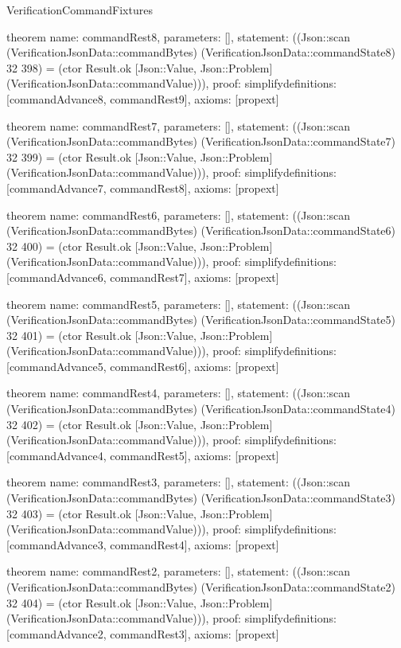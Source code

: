 \begin{lexlean}{VerificationCommandFixtures}
\begin{semanticmodule}
theorem{
  name: commandRest8,
  parameters: [],
  statement: ((Json::scan (VerificationJsonData::commandBytes) (VerificationJsonData::commandState8) 32 398) = (ctor Result.ok [Json::Value, Json::Problem] (VerificationJsonData::commandValue))),
  proof: simplify{definitions: [commandAdvance8, commandRest9]},
  axioms: [propext]
}

theorem{
  name: commandRest7,
  parameters: [],
  statement: ((Json::scan (VerificationJsonData::commandBytes) (VerificationJsonData::commandState7) 32 399) = (ctor Result.ok [Json::Value, Json::Problem] (VerificationJsonData::commandValue))),
  proof: simplify{definitions: [commandAdvance7, commandRest8]},
  axioms: [propext]
}

theorem{
  name: commandRest6,
  parameters: [],
  statement: ((Json::scan (VerificationJsonData::commandBytes) (VerificationJsonData::commandState6) 32 400) = (ctor Result.ok [Json::Value, Json::Problem] (VerificationJsonData::commandValue))),
  proof: simplify{definitions: [commandAdvance6, commandRest7]},
  axioms: [propext]
}

theorem{
  name: commandRest5,
  parameters: [],
  statement: ((Json::scan (VerificationJsonData::commandBytes) (VerificationJsonData::commandState5) 32 401) = (ctor Result.ok [Json::Value, Json::Problem] (VerificationJsonData::commandValue))),
  proof: simplify{definitions: [commandAdvance5, commandRest6]},
  axioms: [propext]
}

theorem{
  name: commandRest4,
  parameters: [],
  statement: ((Json::scan (VerificationJsonData::commandBytes) (VerificationJsonData::commandState4) 32 402) = (ctor Result.ok [Json::Value, Json::Problem] (VerificationJsonData::commandValue))),
  proof: simplify{definitions: [commandAdvance4, commandRest5]},
  axioms: [propext]
}

theorem{
  name: commandRest3,
  parameters: [],
  statement: ((Json::scan (VerificationJsonData::commandBytes) (VerificationJsonData::commandState3) 32 403) = (ctor Result.ok [Json::Value, Json::Problem] (VerificationJsonData::commandValue))),
  proof: simplify{definitions: [commandAdvance3, commandRest4]},
  axioms: [propext]
}

theorem{
  name: commandRest2,
  parameters: [],
  statement: ((Json::scan (VerificationJsonData::commandBytes) (VerificationJsonData::commandState2) 32 404) = (ctor Result.ok [Json::Value, Json::Problem] (VerificationJsonData::commandValue))),
  proof: simplify{definitions: [commandAdvance2, commandRest3]},
  axioms: [propext]
}


\end{semanticmodule}
\end{lexlean}
